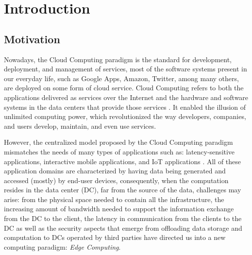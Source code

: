 


\chapter{Introduction}
\label{cha:introduction}


\section{Motivation}

Nowadays, the Cloud Computing paradigm is the standard for development, deployment, and management of services, most of the software systems present in our everyday life, such as Google Apps, Amazon, Twitter, among many others, are deployed on some form of cloud service. Cloud Computing refers to both the applications delivered as services over the Internet and the hardware and software systems in the data centers that provide those services \cite{10.1145/1721654.1721672}. It enabled the illusion of unlimited computing power, which revolutionized the way developers, companies, and users develop, maintain, and even use services.

However, the centralized model proposed by the Cloud Computing paradigm mismatches the needs of many types of applications  such as: latency-sensitive applications, interactive mobile applications, and IoT applications \cite{10.1145/3154815}. All of these application domains are characterized by having data being generated and accessed (mostly) by end-user devices, consequently, when the computation resides in the data center (DC), far from the source of the data, challenges may arise: from the physical space needed to contain all the infrastructure, the increasing amount of bandwidth needed to support the information exchange from the DC to the client, the latency in communication from the clients to the DC as well as the security aspects that emerge from offloading data storage and computation to DCs operated by third parties have directed us into a new computing paradigm: \textit{Edge Computing}.

